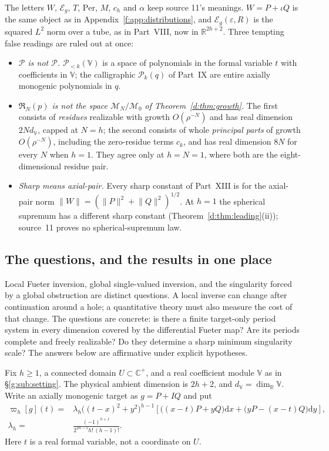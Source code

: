 \documentclass[11pt,a4paper]{article}
\numberwithin{equation}{section}
\theoremstyle{definition}
\theoremstyle{remark}
\theoremstyle{plain}
\newcommand{\RR}{\mathbb R}
\newcommand{\CC}{\mathbb C}
\newcommand{\Cplus}{\CC^{+}}
\newcommand{\Per}{\mathrm{Per}}
\newcommand{\Eg}{\mathcal E_{g}}
\newcommand{\Tube}{T}
\newcommand{\norm}[1]{\lVert #1\rVert}
\newcommand{\dd}{\mathrm d}
\newcommand{\VV}{\mathbb V}                       %
\newcommand{\dV}{d_{\VV}}                         %
\newcommand{\Pol}[1]{\mathscr P_{<#1}(\VV)}       %
\newcommand{\cur}{\varpi}                         %
\newcommand{\Rfilt}{\mathfrak R}                  %
\begin{document}
The letters $W$, $\Eg$, $\Tube$, $\Per$, $M$, $c_h$ and $\alpha$ keep source
11's meanings. $W=P+\iota Q$ is the same object as in Appendix~\ref{f:app:distributions}, and
$\Eg(\varepsilon,R)$ is the squared $L^2$ norm over a tube, as in Part~VIII,
now in $\RR^{2h+2}$. Three tempting false readings are ruled out at once:
\begin{itemize}
\item \emph{$\mathscr P$ is not $\mathcal P$.} $\Pol{k}$ is a space of
polynomials in the formal variable $t$ with coefficients in $\VV$; the
calligraphic $\mathcal P_k(q)$ of Part~IX are entire axially monogenic
polynomials in $q$.
\item \emph{$\Rfilt_N(p)$ is not the space $\mathcal M_N/\mathcal M_0$ of
Theorem~\ref{d:thm:growth}.} The first consists of \emph{residues} realizable
with growth $O(\rho^{-N})$ and has real dimension $2N\dV$, capped at $N=h$; the
second consists of whole \emph{principal parts} of growth $O(\rho^{-N})$,
including the zero-residue terms $c_k$, and has real dimension $8N$ for every
$N$ when $h=1$. They agree only at $h=N=1$, where both are the eight-dimensional
residue pair.
\item \emph{Sharp means axial-pair.} Every sharp constant of Part~XIII is for
the axial-pair norm $\norm W=(\norm P^2+\norm Q^2)^{1/2}$. At $h=1$ the
spherical supremum has a different sharp constant
(Theorem~\ref{d:thm:leading}(ii)); source~11 proves no spherical-supremum law.
\end{itemize}

\subsection{The questions, and the results in one place}
\label{g:sub:questions}

Local Fueter inversion, global single-valued inversion, and the singularity
forced by a global obstruction are distinct questions. A local inverse can
change after continuation around a hole; a quantitative theory must also
measure the cost of that change. The questions are concrete: is there a
finite target-only period system in every dimension covered by the
differential Fueter map? Are its periods complete and freely realizable? Do
they determine a sharp minimum singularity scale? The answers below are
affirmative under explicit hypotheses.

Fix $h\ge1$, a connected domain $U\subset\Cplus$, and a real coefficient
module $\VV$ as in \S\ref{g:sub:setting}. The physical ambient dimension is
$2h+2$, and $\dV=\dim_\RR\VV$. Write an axially monogenic target as $g=P+IQ$
and put
\begin{equation}\label{g:eq:current}
\begin{split}
\cur_h[g](t)={}&\lambda_h\bigl((t-x)^2+y^2\bigr)^{h-1}
 \left[\bigl((x-t)P+yQ\bigr)\dd x+\bigl(yP-(x-t)Q\bigr)\dd y\right],\\
\lambda_h={}&\frac{(-1)^{h+1}}{2^{2h-1}h!\,(h-1)!}.
\end{split}
\end{equation}
Here $t$ is a real formal variable, not a coordinate on $U$.
\end{document}
